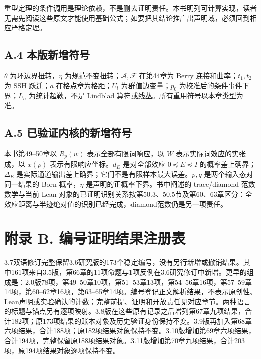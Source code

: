 \documentclass[
  11pt,
  oneside]{book}
\begin{document}
重型定理的条件调用是理论依赖，不是删去证明责任。本书明列可计算实现，读者无需先阅读这些原文才能使用基础公式；如要把其结论推广出声明域，必须回到相应严格定理。

\section{A.4 本版新增符号}

\(\theta\) 为环边界扭转，\(\eta\)
为规范不变扭转；\(\mathcal A,\mathcal F\) 在第44章为 Berry
连接和曲率；\(t_1,t_2\) 为 SSH 跃迁；\(a\) 在格点章为格距；\(U_l\)
为群值边变量；\(p_0\) 为校准后的条件事件下界；\(L_n\) 为统计超鞅，不是
Lindblad 算符或线丛。所有重用符号以本章类型为准。

\section{A.5 已验证内核的新增符号}

本书第49--50章以 \(R_\rho(w)\) 表示全部有限词响应，以 \(W\)
表示实际词效应的实张成，以 \(x(\rho)\) 表示有限响应坐标。\(d_E\)
是对全部效应 \(0\preceq E\preceq I\) 的概率差上确界；\(\Delta_E\)
是实际通道输出差上确界；它们不是有限样本最大误差。\(p,q\)
是两个输入态对同一结果的 Born 概率，\(\eta\)
是声明的正概率下界。书中阐述的 trace/diamond 范数数学与当前 Lean
对象的已证明识别关系按第50.3、50.5节及第60、63章区分：全效应距离与半迹绝对值的识别已经完成，diamond范数仍是另一项责任。

\chapter{附录 B. 编号证明结果注册表}\label{appendix-b}\hypertarget{appendix-b}{}

3.7双语修订完整保留3.6研究版的173个稳定编号，没有另行新增或撤销结果。其中161项来自3.5版，第66章的11项命题与1项反例在3.6研究修订中新增。更早的组成是：2.0版78项，第49--50章10项，第51--53章13项，第54--56章16项，第57--59章14项，第60--62章16项，第63--65章14项。编号登记正文解析结果，不表示原创性、Lean声明或实验确认的计数；完整前提、证明和开放责任见对应章节。两种语言的标题与锚点另有逐项映射。3.8版在这些原有记录之后增列第67章九项结果，合计182项；原173项结果的账本对象及历史验证身份保持不变。3.9版再加入第68章六项结果，合计188项；原182项结果对象保持不变。3.10版增加第69章六项结果，合计194项，完整保留原188项结果对象。3.11版增加第70章九项结果，合计203项，原194项结果对象逐项保持不变。
\end{document}
